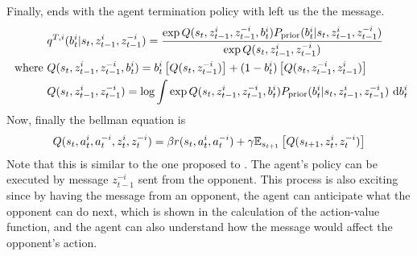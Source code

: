 Finally, ends with the agent termination policy with left us the the message.
\begin{equation}
\begin{aligned}
    &q^{T,i}(b^i_t | s_t, z^i_{t-1}, z^{-i}_{t-1}) = \frac{\exp Q(s_t, z^i_{t-1}, z^{-i}_{t-1}, b^i_t) P_{\text{prior}}(b^i_t | s_t, z^i_{t-1}, z^{-i}_{t-1})}{\exp Q(s_t, z^i_{t-1}, z^{-i}_{t-1}) } \\
    \text{ where }&Q(s_t, z^i_{t-1}, z^{-i}_{t-1}, b^i_t)  = b^i_t\left[ Q(s_t,  z^{-i}_{t-1}) \right] + (1-b^i_t)\left[ Q(s_t,  z^{-i}_{t-1}, z^i_{t-1}) \right] \\
    &Q(s_t, z^i_{t-1}, z^{-i}_{t-1}) = \log \int \exp Q(s_t, z^i_{t-1}, z^{-i}_{t-1}, b^i_t) P_{\text{prior}}(b^i_t | s_t, z^i_{t-1}, z^{-i}_{t-1}) \ \mathrm{d} b^i_t
\end{aligned}
\end{equation}
Now, finally the bellman equation is 
\begin{equation}
    Q(s_t, a_t^i, a^{-i}_t, z^i_{t}, z^{-i}_{t} ) = \beta r(s_t, a_t^i, a^{-i}_t) + \gamma\mathbb{E}_{s_{t+1}}\left[ Q(s_{t+1}, z^i_{t}, z^{-i}_{t}) \right]
\end{equation}
Note that this is similar to the one proposed to \cite{han2019multi}. The agent's policy can be executed by message $z_{t-1}^{-i}$ sent from the opponent. This process is also exciting since by having the message from an opponent, the agent can anticipate what the opponent can do next, which is shown in the calculation of the action-value function, and the agent can also understand how the message would affect the opponent's action.
